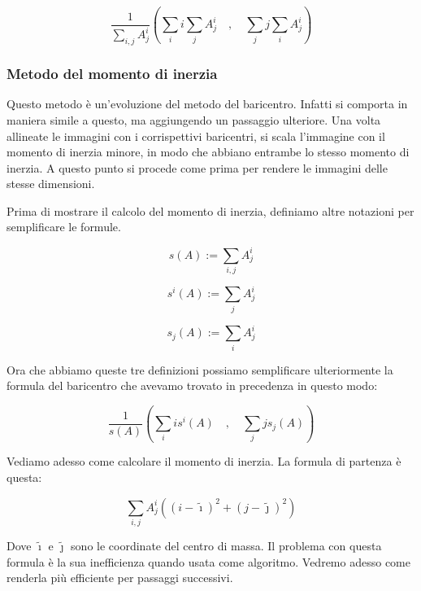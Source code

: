 \begin{equation*}
    \frac{1}{\displaystyle{\sum_{i,j} A^i_j}}
    \left(
        \sum_i i \sum_j A^i_j
        \quad , \quad
        \sum_j j \sum_i A^i_j
    \right)
\end{equation*}

\subsubsection{Metodo del momento di inerzia}

Questo metodo \`e un'evoluzione del metodo del baricentro. Infatti si comporta in maniera simile a questo, ma aggiungendo un passaggio ulteriore. Una volta allineate le immagini con i corrispettivi baricentri, si scala l'immagine con il momento di inerzia minore, in modo che abbiano entrambe lo stesso momento di inerzia. A questo punto si procede come prima per rendere le immagini delle stesse dimensioni.

Prima di mostrare il calcolo del momento di inerzia, definiamo altre notazioni per semplificare le formule.

\begin{equation*}
    s(A) := \sum_{i,j} A^i_j
\end{equation*}

\begin{equation*}
    s^i(A) := \sum_j A^i_j
\end{equation*}

\begin{equation*}
    s_j(A) := \sum_i A^i_j
\end{equation*}

Ora che abbiamo queste tre definizioni possiamo semplificare ulteriormente la formula del baricentro che avevamo trovato in precedenza in questo modo:

\begin{equation*}
    \frac{1}{s(A)}
    \left(
        \sum_i i s^i(A)
        \quad , \quad
        \sum_j j s_j(A)
    \right)
\end{equation*}

Vediamo adesso come calcolare il momento di inerzia. La formula di partenza \`e questa:

\begin{equation*}
    \sum_{i,j} A^i_j \left( (i-\tilde{ \imath })^2 + (j-\tilde{ \jmath })^2 \right)
\end{equation*}

Dove $\tilde{\imath}$ e $\tilde{\jmath}$ sono le coordinate del centro di massa. Il problema con questa formula \`e la sua inefficienza quando usata come algoritmo. Vedremo adesso come renderla pi\`u efficiente per passaggi successivi.

